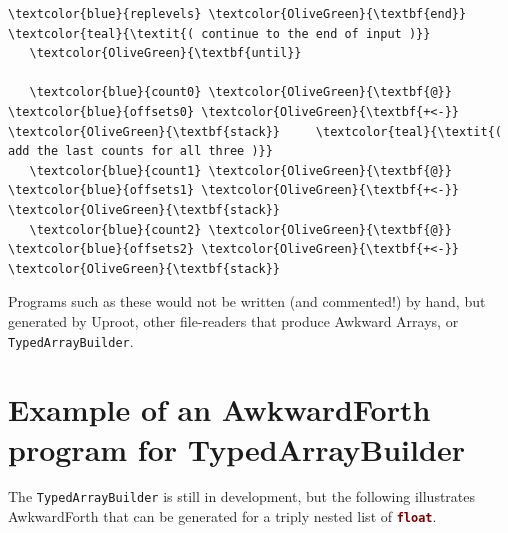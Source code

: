 \documentclass{webofc}
\begin{document}
\begin{Verbatim}[commandchars=\\\{\}]
     \textcolor{blue}{replevels} \textcolor{OliveGreen}{\textbf{end}}                 \textcolor{teal}{\textit{( continue to the end of input )}}
   \textcolor{OliveGreen}{\textbf{until}}

   \textcolor{blue}{count0} \textcolor{OliveGreen}{\textbf{@}} \textcolor{blue}{offsets0} \textcolor{OliveGreen}{\textbf{+<-}} \textcolor{OliveGreen}{\textbf{stack}}     \textcolor{teal}{\textit{( add the last counts for all three )}}
   \textcolor{blue}{count1} \textcolor{OliveGreen}{\textbf{@}} \textcolor{blue}{offsets1} \textcolor{OliveGreen}{\textbf{+<-}} \textcolor{OliveGreen}{\textbf{stack}}
   \textcolor{blue}{count2} \textcolor{OliveGreen}{\textbf{@}} \textcolor{blue}{offsets2} \textcolor{OliveGreen}{\textbf{+<-}} \textcolor{OliveGreen}{\textbf{stack}}
\end{Verbatim}
\normalsize

Programs such as these would not be written (and commented!) by hand, but generated by Uproot, other file-readers that produce Awkward Arrays, or {\tt TypedArrayBuilder}.

\section{Example of an AwkwardForth program for TypedArrayBuilder}

The {\tt TypedArrayBuilder} is still in development, but the following illustrates AwkwardForth that can be generated for a triply nested list of \textcolor{Maroon}{\tt\textbf{float}}.
\end{document}
